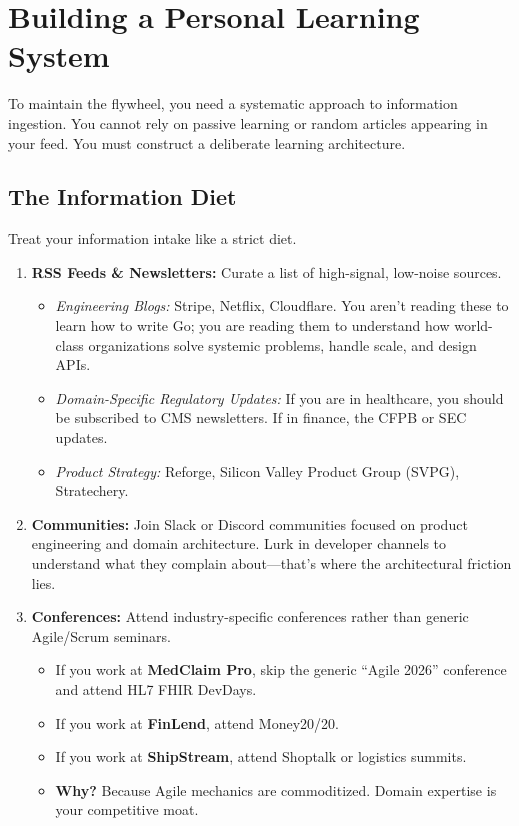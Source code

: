 \documentclass[
  11pt,
  openany,
  oneside]{book}
\providecommand{\tightlist}{%
  \setlength{\itemsep}{0pt}\setlength{\parskip}{0pt}}
\begin{document}
\bigskip

\section{Building a Personal Learning
System}\label{building-a-personal-learning-system}

To maintain the flywheel, you need a systematic approach to information
ingestion. You cannot rely on passive learning or random articles
appearing in your feed. You must construct a deliberate learning
architecture.

\subsection{The Information Diet}\label{the-information-diet}

Treat your information intake like a strict diet.

\begin{enumerate}
\def\labelenumi{\arabic{enumi}.}
\tightlist
\item
  \textbf{RSS Feeds \& Newsletters:} Curate a list of high-signal,
  low-noise sources.

  \begin{itemize}
  \tightlist
  \item
    \emph{Engineering Blogs:} Stripe, Netflix, Cloudflare. You aren't
    reading these to learn how to write Go; you are reading them to
    understand how world-class organizations solve systemic problems,
    handle scale, and design APIs.
  \item
    \emph{Domain-Specific Regulatory Updates:} If you are in healthcare,
    you should be subscribed to CMS newsletters. If in finance, the CFPB
    or SEC updates.
  \item
    \emph{Product Strategy:} Reforge, Silicon Valley Product Group
    (SVPG), Stratechery.
  \end{itemize}
\item
  \textbf{Communities:} Join Slack or Discord communities focused on
  product engineering and domain architecture. Lurk in developer
  channels to understand what they complain about---that's where the
  architectural friction lies.
\item
  \textbf{Conferences:} Attend industry-specific conferences rather than
  generic Agile/Scrum seminars.

  \begin{itemize}
  \tightlist
  \item
    If you work at \textbf{MedClaim Pro}, skip the generic ``Agile
    2026'' conference and attend HL7 FHIR DevDays.
  \item
    If you work at \textbf{FinLend}, attend Money20/20.
  \item
    If you work at \textbf{ShipStream}, attend Shoptalk or logistics
    summits.
  \item
    \textbf{Why?} Because Agile mechanics are commoditized. Domain
    expertise is your competitive moat.
  \end{itemize}
\end{enumerate}
\end{document}

